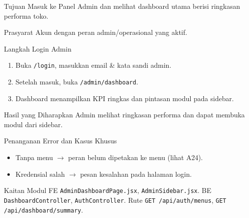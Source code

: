 
\begin{flowsection}{Tujuan}
Masuk ke Panel Admin dan melihat dashboard utama berisi ringkasan performa toko.
\end{flowsection}

\begin{flowsection}{Prasyarat}
Akun dengan peran admin/operasional yang aktif.
\end{flowsection}

\begin{flowsection}{Langkah Login Admin}
\begin{enumerate}
  \item Buka \texttt{/login}, masukkan email \& kata sandi admin.
  \item Setelah masuk, buka \texttt{/admin/dashboard}.
  \item Dashboard menampilkan KPI ringkas dan pintasan modul pada sidebar.
\end{enumerate}
\end{flowsection}


\begin{flowsection}{Hasil yang Diharapkan}
Admin melihat ringkasan performa dan dapat membuka modul dari sidebar.
\end{flowsection}

\begin{flowsection}{Penanganan Error dan Kasus Khusus}
\begin{itemize}
  \item Tanpa menu $\rightarrow$ peran belum dipetakan ke menu (lihat A24).
  \item Kredensial salah $\rightarrow$ pesan kesalahan pada halaman login.
\end{itemize}
\end{flowsection}

\begin{flowsection}{Kaitan Modul}
FE \texttt{AdminDashboardPage.jsx}, \texttt{AdminSidebar.jsx}. BE
\texttt{DashboardController}, \texttt{AuthController}. Rute \texttt{GET /api/auth/menus},
\texttt{GET /api/dashboard/summary}.
\end{flowsection}

